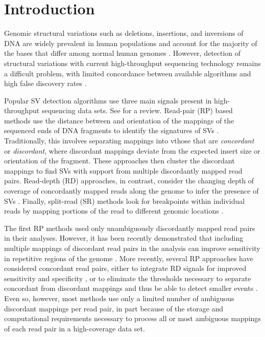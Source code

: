 \documentclass[11pt]{article}
\begin{document}
\newpage

\section{Introduction}

Genomic structural variations such as deletions, insertions, and inversions of DNA are widely prevalent in human populations and account for the majority of the bases that differ among normal human genomes \autocite{Mills:2011p1611, Conrad:2010ja}. However, detection of structural variations with current high-throughput sequencing technology remains a difficult problem, with limited concordance between available algorithms and high false discovery rates \autocite{Mills:2011p1611}.

Popular SV detection algorithms use three main signals present in high-throughput sequencing data sets. See \textcite{Alkan:2011p547} for a review. Read-pair (RP) based methods use the distance between and orientation of the mappings of the sequenced ends of DNA fragments to identify the signatures of SVs \autocite{Campbell:2008p539,Chen:2009p3,Hormozdiari:2009p284,Sindi:2009gu,Korbel:2009dy}. Traditionally, this involves separating mappings into vthose that are \emph{concordant} or \emph{discordant}, where discordant mappings deviate from the expected insert size or orientation of the fragment. These approaches then cluster the discordant mappings to find SVs with support from multiple discordantly mapped read pairs. Read-depth (RD) approaches, in contrast, consider the changing depth of coverage of concordantly mapped reads along the genome to infer the presence of SVs \autocite{Abyzov:2011bk,Alkan:2009cr,Yoon:2009kb,Chiang:2009di}. Finally, split-read (SR) methods look for breakpoints within individual reads by mapping portions of the read to different genomic locations \autocite{Wang:2011p1607,Ye:2009p2}.

The first RP methods used only unambiguously discordantly mapped read pairs in their analyses. However, it has been recently demonstrated that including multiple mappings of discordant read pairs in the analysis can improve sensitivity in repetitive regions of the genome \autocite{Hormozdiari:2009p284,Quinlan:2010gf}. More recently, several RP approaches have considered concordant read pairs, either to integrate RD signals for improved sensitivity and specificity \autocite{Sindi:2012kk,Michaelson:2012fj,Chiara:2012ey}, or to eliminate the thresholds necessary to separate concordant from discordant mappings and thus be able to detect smaller events \autocite{Marschall:2012ek}. Even so, however, most methods use only a limited number of ambiguous discordant mappings per read pair, in part because of the storage and computational requirements necessary to process all or most ambiguous mappings of each read pair in a high-coverage data set.
\end{document}
